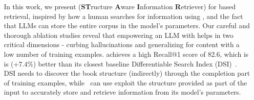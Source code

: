 In this work, we present {\sys} (\textbf{ST}ructure \textbf{A}ware \textbf{I}nformation \textbf{R}etriever) for {\toc} based retrieval, inspired by how a human searches for information using {\toc}, and the fact that LLMs can store the entire corpus in the model's parameters. Our careful and thorough ablation studies reveal that empowering an LLM with {\toc} helps in two critical dimensions - curbing hallucinations and generalizing for content with a low number of training examples. {\sys} achieves a high Recall@1 score of 82.6, which is is ($+7.4\%$) better than its closest baseline Differentiable Search Index (DSI)~\cite{Tay2022TransformerMA}. DSI needs to discover the book structure (indirectly) through the completion part of training examples, while {\sys}\ can use exploit the structure provided as part of the input to accurately store and retrieve information from its model's parameters.


